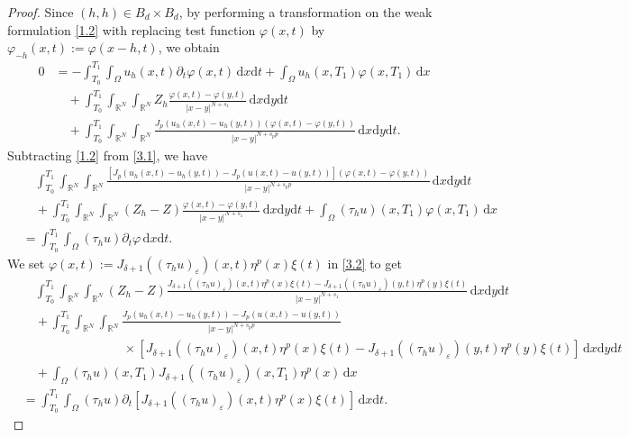 \documentclass[reqno,10pt]{amsart}
\numberwithin{equation}{section}
\begin{document}
\begin{proof}
	Since $(h,h)\in B_{d}\times B_{d}$, by performing a transformation on the weak formulation \eqref{1.2} with replacing test function $\varphi(x,t)$ by $\varphi_{-h}(x,t):=\varphi(x-h,t)$, we obtain
	\begin{align}
		\label{3.1}
		0&=-\int_{T_0}^{T_1}\int_\Omega u_h(x,t)\partial_t\varphi(x,t)\,\mathrm{d}x\mathrm{d}t+\int_{\Omega}u_h(x,T_1)\varphi(x,T_1)\,\mathrm{d}x\nonumber\\
		&\quad+\int_{T_0}^{T_1}\int_{\mathbb{R}^N}\int_{\mathbb{R}^N}Z_h\frac{\varphi(x,t)-\varphi(y,t)}{|x-y|^{N+s_1}}\,\mathrm{d}x\mathrm{d}y\mathrm{d}t\nonumber\\
		&\quad+\int_{T_0}^{T_1}\int_{\mathbb{R}^N}\int_{\mathbb{R}^N}\frac{J_p\left(u_h(x,t)-u_h(y,t)\right)\left(\varphi(x,t)-\varphi(y,t)\right)}{|x-y|^{N+s_pp}}\,\mathrm{d}x\mathrm{d}y\mathrm{d}t.
	\end{align}
	Subtracting \eqref{1.2} from \eqref{3.1}, we have
	\begin{align}
		\label{3.2}
		&\quad\int_{T_0}^{T_1}\int_{\mathbb{R}^N}\int_{\mathbb{R}^N}\frac{\left[J_p\left(u_h(x,t)-u_h(y,t)\right)-J_p\left(u(x,t)-u(y,t)\right)\right]\left(\varphi(x,t)-\varphi(y,t)\right)}{|x-y|^{N+s_pp}}\,\mathrm{d}x\mathrm{d}y\mathrm{d}t\nonumber\\
		&\quad+\int_{T_0}^{T_1}\int_{\mathbb{R}^N}\int_{\mathbb{R}^N}(Z_h-Z)\frac{\varphi(x,t)-\varphi(y,t)}{|x-y|^{N+s_1}}\,\mathrm{d}x\mathrm{d}y\mathrm{d}t+\int_{\Omega}\left(\tau_hu\right)(x,T_1)\varphi(x,T_1)\,\mathrm{d}x\nonumber\\
		&=\int_{T_0}^{T_1}\int_{\Omega}(\tau_hu)\partial_t\varphi\,\mathrm{d}x\mathrm{d}t.
	\end{align}
	We set $\varphi(x,t):=J_{\delta+1}\left((\tau_hu)_{\varepsilon}\right)(x,t)\eta^p(x)\xi(t)$ in \eqref{3.2} to get
	\begin{align}
		\label{3.3}
		&\quad\int_{T_0}^{T_1}\int_{\mathbb{R}^N}\int_{\mathbb{R}^N}(Z_h-Z)\frac{J_{\delta+1}\left((\tau_hu)_{\varepsilon}\right)(x,t)\eta^p(x)\xi(t)-J_{\delta+1}\left((\tau_hu)_{\varepsilon}\right)(y,t)\eta^p(y)\xi(t)}{|x-y|^{N+s_1}}\,\mathrm{d}x\mathrm{d}y\mathrm{d}t\nonumber\\
		&\quad+\int_{T_0}^{T_1}\int_{\mathbb{R}^N}\int_{\mathbb{R}^N}\frac{J_p\left(u_h(x,t)-u_h(y,t)\right)-J_p\left(u(x,t)-u(y,t)\right)}{|x-y|^{N+s_pp}}\nonumber\\
		&\qquad\qquad\qquad\qquad\times\left[J_{\delta+1}\left((\tau_hu)_{\varepsilon}\right)(x,t)\eta^p(x)\xi(t)-J_{\delta+1}\left((\tau_hu)_{\varepsilon}\right)(y,t)\eta^p(y)\xi(t)\right]\,\mathrm{d}x\mathrm{d}y\mathrm{d}t\nonumber\\
		&\quad+\int_{\Omega}\left(\tau_hu\right)(x,T_1)J_{\delta+1}\left((\tau_hu)_{\varepsilon}\right)(x,T_1)\eta^p(x)\,\mathrm{d}x\nonumber\\
		&=\int_{T_0}^{T_1}\int_{\Omega}(\tau_hu)\partial_t\left[J_{\delta+1}\left((\tau_hu)_{\varepsilon}\right)(x,t)\eta^p(x)\xi(t)\right]\,\mathrm{d}x\mathrm{d}t. 
	\end{align}
	

\end{proof}
\end{document}
